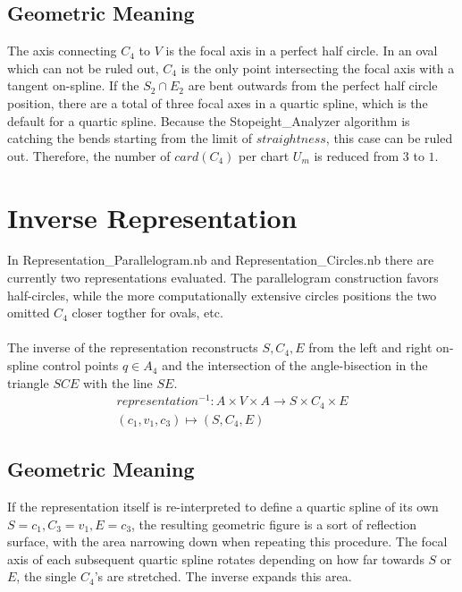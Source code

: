 \documentclass[a4paper,portrait]{report}
\begin{document}
\section{Geometric Meaning}
The axis connecting $C_{4}$ to $V$ is the focal axis in a perfect half circle. In an oval which can not be ruled out, $C_{4}$ is the only point intersecting the focal axis with a tangent on-spline. If the $S_{2}\cap E_{2}$ are bent outwards from the perfect half circle position, there are a total of three focal axes in a quartic spline, which is the default for a quartic spline. Because the Stopeight\_Analyzer algorithm is catching the bends starting from the limit of $straightness$, this case can be ruled out. Therefore, the number of $card(C_{4})$ per chart $U_{m}$ is reduced from $3$ to $1$.

\chapter{Inverse Representation}
In Representation\_Parallelogram.nb and Representation\_Circles.nb there are currently two representations evaluated. The parallelogram construction favors half-circles, while the more computationally extensive circles positions the two omitted $C_{4}$ closer togther for ovals, etc.\\\\
The inverse of the representation reconstructs $S,C_{4},E$ from the left and right on-spline control points $q \in A_{4}$ and the intersection of the angle-bisection in the triangle $SCE$ with the line $SE$.
\begin{align}
representation^{-1}: A \times V \times A \rightarrow S \times C_{4} \times E\\
(c_{1},v_{1},c_{3})\mapsto(S,C_{4},E)
\end{align}
\section{Geometric Meaning}
If the representation itself is re-interpreted to define a quartic spline of its own $S=c_{1},C_{3}=v_{1},E=c_{3}$, the resulting geometric figure is a sort of reflection surface, with the area narrowing down when repeating this procedure. The focal axis of each subsequent quartic spline rotates depending on how far towards $S$ or $E$, the single $C_{4}$'s are stretched. The inverse expands this area.
\end{document}
